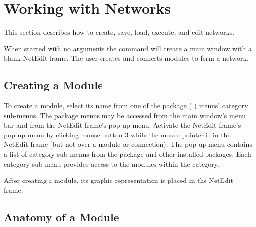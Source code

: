 %
%
%
%
%

%

\section{Working with Networks}
\label{sec:workwithnets}

This section describes how to create, save, load, execute, and edit
networks.

When started with no arguments the  command will create a
main window with a blank NetEdit frame. The user creates and
connects modules to form a network.


\subsection{Creating a Module}
\label{sec:creatingmodules}

To create a module, select its name from one of the package (\eg{} \sr)
menus' category sub-menus.  The package menus may be accessed from the
main window's menu bar and from the NetEdit frame's pop-up menu. 
Activate the NetEdit frame's pop-up menu by clicking mouse button
3 while the mouse pointer is in the NetEdit frame (but not over a
module or connection).  The pop-up menu contains a list of category
sub-menus from the \sr{} package and other installed packages. 
Each category sub-menu provides access to the modules within the
category.

After creating a module, its graphic representation is 
placed in the NetEdit frame.

\subsection{Anatomy of a Module}
\label{sec:modanatomy}

  \newcommand{\modgraphic}%
  {\centerline{\epsfig{file=Figures/modgraphic-1.eps.gz,width=4in,
        bbllx=0, bblly=0, bburx=325, bbury=157}}}
\begin{htmlonly}
  \newcommand{\modgraphic}{%
  \htmladdimg[align=top,width="256",alt="SCIRun Module Graphic"]
  {../Figures/modgraphic-1.gif}}
\end{htmlonly}

